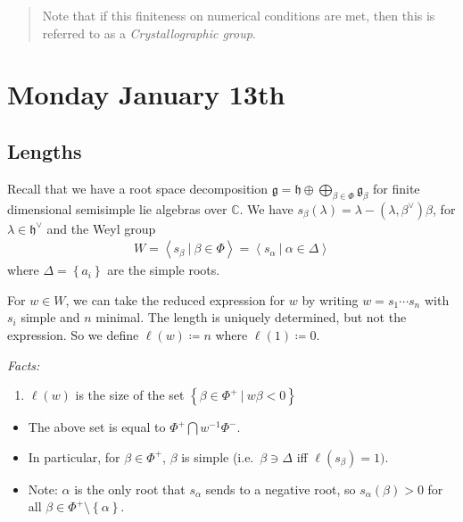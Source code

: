 \documentclass[11pt]{scrartcl}
\theoremstyle{definition}
\theoremstyle{theorem}
\theoremstyle{proof}
\theoremstyle{definition}
\theoremstyle{break}
\theoremstyle{problem}
\providecommand{\tightlist}{%
  \setlength{\itemsep}{0pt}\setlength{\parskip}{0pt}}
\newcommand{\CC}[0]{{\mathbb{C}}}
\newcommand{\definedas}[0]{\coloneqq}
\newcommand{\dual}[0]{^\vee}
\newcommand{\generators}[1]{\left\langle{#1}\right\rangle}
\newcommand{\intersect}[0]{\bigcap}
\newcommand{\inv}[0]{^{-1}}
\newcommand{\lieg}[0]{{\mathfrak{g}}}
\newcommand{\lieh}[0]{{\mathfrak{h}}}
\newcommand{\suchthat}[0]{{~\mathrel{\Big|}~}}
\newcommand{\theset}[1]{\left\{{#1}\right\}}
\begin{document}
\begin{quote}
Note that if this finiteness on numerical conditions are met, then this
is referred to as a \emph{Crystallographic group}.
\end{quote}

\hypertarget{monday-january-13th}{%
\section{Monday January 13th}\label{monday-january-13th}}

\hypertarget{lengths}{%
\subsection{Lengths}\label{lengths}}

Recall that we have a root space decomposition
\(\lieg = \lieh \oplus \bigoplus_{\beta \in \Phi} \lieg_\beta\) for
finite dimensional semisimple lie algebras over \(\CC\). We have
\(s_\beta(\lambda) = \lambda - (\lambda, \beta\dual)\beta\), for
\(\lambda \in \lieh\dual\) and the Weyl group
\begin{align*}
W = \generators{s_\beta \suchthat \beta\in\Phi} = \generators{s_\alpha \suchthat \alpha \in \Delta}
\end{align*} where \(\Delta = \theset{a_i}\) are the simple roots.

For \(w\in W\), we can take the reduced expression for \(w\) by writing
\(w = s_1 \cdots s_n\) with \(s_i\) simple and \(n\) minimal. The length
is uniquely determined, but not the expression. So we define
\(\ell(w) \definedas n\) where \(\ell(1) \definedas 0\).

\emph{Facts:}

\begin{enumerate}
\def\labelenumi{\arabic{enumi}.}
\tightlist
\item
  \(\ell(w)\) is the size of the set
  \(\theset{\beta\in\Phi^+ \suchthat w\beta < 0}\)
\end{enumerate}

\begin{itemize}
\tightlist
\item
  The above set is equal to \(\Phi^+ \intersect w\inv \Phi^-\).
\item
  In particular, for \(\beta \in \Phi^+\), \(\beta\) is simple
  (i.e.~\(\beta \ni \Delta\) iff \(\ell(s_\beta) = 1)\).
\item
  Note: \(\alpha\) is the only root that \(s_\alpha\) sends to a
  negative root, so \(s_\alpha(\beta) > 0\) for all
  \(\beta\in\Phi^+\setminus\theset{\alpha}\).
\end{itemize}
\end{document}
